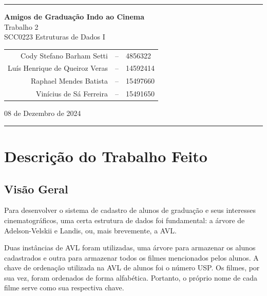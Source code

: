 \documentclass[12pt,a4paper,portuguese]{article}
\begin{document}
    \vspace{5mm}
    \rule{0.95\textwidth}{1pt}
    \vspace{3mm}
    \begin{center}
        \textbf{\huge Amigos de Graduação Indo ao Cinema} \\
        \Large Trabalho 2 \\
        \large SCC0223 Estruturas de Dados I
    
        \vspace{8mm}
        \begin{tabular}{rcl}
            Cody Stefano Barham Setti &-- &4856322 \\
            Luís Henrique de Queiroz Veras &-- &14592414 \\
            Raphael Mendes Batista &-- &15497660 \\
            Vinícius de Sá Ferreira &-- &15491650 \\
        \end{tabular}

    \vspace{8mm}
    08 de Dezembro de 2024
    \end{center}

    \vspace{1mm}
    \rule{0.95\textwidth}{1pt}
    \vspace{0.5cm}

    \section{Descrição do Trabalho Feito}
    \subsection{Visão Geral}
        Para desenvolver o sistema de cadastro de alunos de graduação e seus interesses cinematográficos, uma certa estrutura de dados foi fundamental: a árvore de Adelson-Velskii e Landis, ou, mais brevemente, a AVL.
        
        Duas instâncias de AVL foram utilizadas, uma árvore para armazenar os alunos cadastrados e outra para armazenar todos os filmes mencionados pelos alunos. A chave de ordenação utilizada na AVL de alunos foi o número USP. Os filmes, por sua vez, foram ordenados de forma alfabética. Portanto, o próprio nome de cada filme serve como sua respectiva chave.
\end{document}
